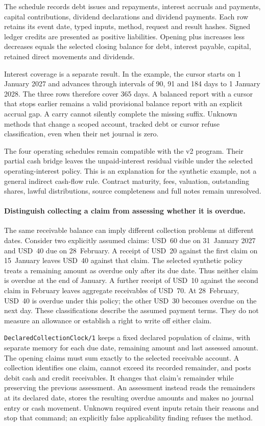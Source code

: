 The schedule records debt issues and repayments, interest accruals and payments, capital contributions, dividend declarations and dividend payments. Each row retains its event date, typed inputs, method, request and result hashes. Signed ledger credits are presented as positive liabilities. Opening plus increases less decreases equals the selected closing balance for debt, interest payable, capital, retained direct movements and dividends.

Interest coverage is a separate result. In the example, the cursor starts on 1 January 2027 and advances through intervals of 90, 91 and 184 days to 1 January 2028. The three rows therefore cover 365 days. A balanced report with a cursor that stops earlier remains a valid provisional balance report with an explicit accrual gap. A carry cannot silently complete the missing suffix. Unknown methods that change a scoped account, tracked debt or cursor refuse classification, even when their net journal is zero.

The four operating schedules remain compatible with the v2 program. Their partial cash bridge leaves the unpaid-interest residual visible under the selected operating-interest policy. This is an explanation for the synthetic example, not a general indirect cash-flow rule. Contract maturity, fees, valuation, outstanding shares, lawful distributions, source completeness and full notes remain unresolved.

\paragraph{Distinguish collecting a claim from assessing whether it is overdue.}
The same receivable balance can imply different collection problems at different
dates. Consider two explicitly assumed claims: USD~60 due on 31~January 2027
and USD~40 due on 28~February. A receipt of USD~20 against the first claim on
15~January leaves USD~40 against that claim. The selected synthetic policy treats
a remaining amount as overdue only after its due date. Thus neither claim is
overdue at the end of January. A further receipt of USD~10 against the second
claim in February leaves aggregate receivables of USD~70. At 28~February, USD~40
is overdue under this policy; the other USD~30 becomes overdue on the next day.
These classifications describe the assumed payment terms. They do not measure
an allowance or establish a right to write off either claim.

\texttt{DeclaredCollectionClock/1} keeps a fixed declared population of claims,
with separate memory for each due date, remaining amount and last assessed
amount. The opening claims must sum exactly to the selected receivable account.
A collection identifies one claim, cannot exceed its recorded remainder, and
posts debit cash and credit receivables. It changes that claim's remainder while
preserving the previous assessment. An assessment instead reads the remainders
at its declared date, stores the resulting overdue amounts and makes no journal
entry or cash movement. Unknown required event inputs retain their reasons and
stop that command; an explicitly false applicability finding refuses the method.

